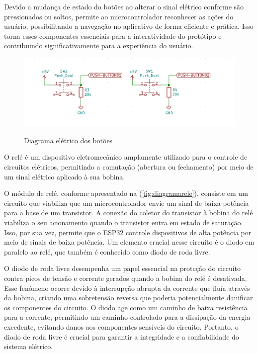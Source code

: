 Devido a mudança de estado do botões ao alterar o sinal elétrico conforme 
são pressionados ou soltos, permite ao microcontrolador reconhecer as ações 
do usuário, possibilitando a navegação no aplicativo de forma eficiente 
e prática. Isso torna esses componentes essenciais para a interatividade 
do protótipo e contribuindo significativamente para a experiência do usuário.

\begin{figure}[h!]
    \centering
    \caption{Diagrama elétrico dos botões}
    \includegraphics[scale=0.25]{figuras/modulo_push.png}
    \fonte{}%
    \label{fig:diagramabotoes}
    \centering
\end{figure}

O relé é um dispositivo eletromecânico amplamente utilizado para o controle 
de circuitos elétricos, permitindo a comutação (abertura ou fechamento) 
por meio de um sinal elétrico aplicado à sua bobina.

O módulo de relé, conforme apresentado na (\autoref{fig:diagramarele}), 
consiste em um circuito que viabiliza que um microcontrolador 
envie um sinal de baixa potência para a base de um transistor. A conexão do 
coletor do transistor à bobina do relé viabiliza o seu acionamento 
quando o transistor entra em estado de saturação. Isso, por sua vez, permite que o ESP32 
controle dispositivos de alta potência por meio de sinais de baixa potência. 
Um elemento crucial nesse circuito é o diodo em paralelo ao relé, 
que também é conhecido como diodo de roda livre.

O diodo de roda livre desempenha um papel essencial na proteção do 
circuito contra picos de tensão e corrente gerados quando a bobina 
do relé é desativada. Esse fenômeno ocorre devido à interrupção 
abrupta da corrente que fluía através da bobina, criando uma sobretensão 
reversa que poderia potencialmente danificar os componentes do circuito. 
O diodo age como um caminho de baixa resistência para a corrente, 
permitindo um caminho controlado para a dissipação da energia excedente, 
evitando danos aos componentes sensíveis do circuito. Portanto, o diodo 
de roda livre é crucial para garantir a integridade e a confiabilidade 
do sistema elétrico.

